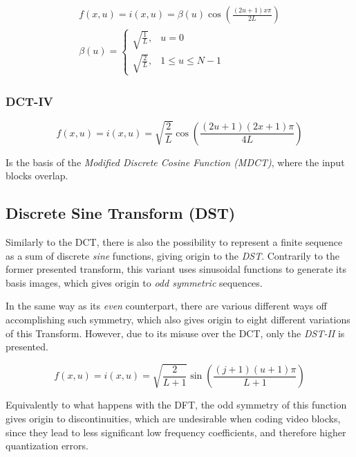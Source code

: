 \begin{gather}
    f(x,u) = i(x,u) = \beta(u)\cos\left(\frac{(2u+1)x\pi }{2L}\right) \\
    \beta(u)= \begin{cases}
                    \sqrt{\frac{1}{L}}, & u=0 \\
                    \sqrt{\frac{2}{L}}, & 1 \leq u \leq N-1
                \end{cases}
\end{gather}

\subsubsection{DCT-IV}

\nocite{DiscreteCosineTransform}

\begin{equation}
    f(x,u) = i(x,u) = \sqrt{\frac{2}{L}}\cos\left(\frac{(2u+1)(2x+1)\pi }{4L}\right)
\end{equation}

Is the basis of the \emph{Modified Discrete Cosine Function (MDCT)}, where the input blocks overlap.

\subsection{Discrete Sine Transform (DST)}

\nocite{prattDigitalImageProcessing2001}

Similarly to the DCT, there is also the possibility to represent a finite sequence as a sum of discrete \emph{sine} functions, giving origin to the \emph{DST}. Contrarily to the former presented transform, this variant uses sinusoidal functions to generate its basis images, which gives origin to \emph{odd symmetric} sequences.

In the same way as its \emph{even} counterpart, there are various different ways off accomplishing such symmetry, which also gives origin to eight different variations of this Transform. However, due to its misuse over the DCT, only the \emph{DST-II} is presented.

\begin{equation}
    f(x,u) = i(x,u) = \sqrt{\frac{2}{L+1}}\sin\left(\frac{(j+1)(u+1)\pi}{L+1}\right)
\end{equation}

Equivalently to what happens with the DFT, the odd symmetry of this function gives origin to discontinuities, which are undesirable when coding video blocks, since they lead to less significant low frequency coefficients, and therefore higher quantization errors.

